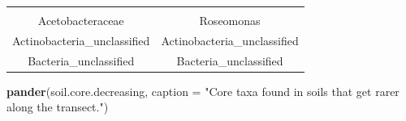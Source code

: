 \documentclass[]{article}
\newenvironment{Shaded}{\begin{snugshade}}{\end{snugshade}}
\newcommand{\KeywordTok}[1]{\textcolor[rgb]{0.13,0.29,0.53}{\textbf{#1}}}
\newcommand{\DataTypeTok}[1]{\textcolor[rgb]{0.13,0.29,0.53}{#1}}
\newcommand{\StringTok}[1]{\textcolor[rgb]{0.31,0.60,0.02}{#1}}
\newcommand{\NormalTok}[1]{#1}
\begin{document}
\begin{longtable}[]{@{}cc@{}}
\begin{minipage}[t]{0.42\columnwidth}
\end{minipage}\tabularnewline
\begin{minipage}[t]{0.41\columnwidth}\centering\strut
Acetobacteraceae\strut
\end{minipage} & \begin{minipage}[t]{0.42\columnwidth}\centering\strut
Roseomonas\strut
\end{minipage}\tabularnewline
\begin{minipage}[t]{0.41\columnwidth}\centering\strut
Actinobacteria\_unclassified\strut
\end{minipage} & \begin{minipage}[t]{0.42\columnwidth}\centering\strut
Actinobacteria\_unclassified\strut
\end{minipage}\tabularnewline
\begin{minipage}[t]{0.41\columnwidth}\centering\strut
Bacteria\_unclassified\strut
\end{minipage} & \begin{minipage}[t]{0.42\columnwidth}\centering\strut
Bacteria\_unclassified\strut
\end{minipage}\tabularnewline
\bottomrule
\end{longtable}

\begin{Shaded}
\begin{Highlighting}[]
\KeywordTok{pander}\NormalTok{(soil.core.decreasing, }\DataTypeTok{caption =} \StringTok{"Core taxa found in soils that get rarer along the transect."}\NormalTok{)}
\end{Highlighting}
\end{Shaded}
\end{document}
